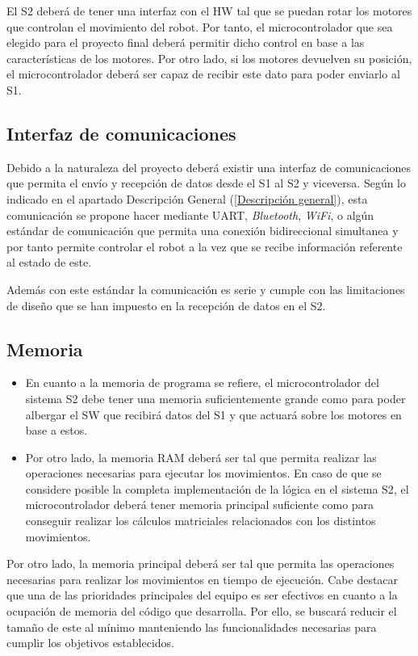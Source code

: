 El \ac{S2} deberá de tener una interfaz con el \ac{HW} tal que se puedan rotar los motores que controlan el movimiento del robot. Por tanto, el microcontrolador que sea elegido para el proyecto final deberá permitir dicho control en base a las características de los motores. Por otro lado, si los motores devuelven su posición, el microcontrolador deberá ser capaz de recibir este dato para poder enviarlo al \ac{S1}.

\subsection{Interfaz de comunicaciones}
Debido a la naturaleza del proyecto deberá existir una interfaz de comunicaciones que permita el envío y recepción de datos desde el \ac{S1} al \ac{S2} y viceversa. Según lo indicado en el apartado Descripción General (\ref{Descripción general}), esta comunicación se propone hacer mediante \ac{UART}, \textit{Bluetooth}, \textit{WiFi}, o algún estándar de comunicación que permita una conexión bidireccional simultanea y por tanto permite controlar el robot a la vez que se recibe información referente al estado de este. 

Además con este estándar la comunicación es serie y cumple con las limitaciones de diseño que se han impuesto en la recepción de datos en el \ac{S2}.

\subsection{Memoria}

\begin{itemize}

    \item En cuanto a la memoria de programa se refiere, el microcontrolador del sistema \ac{S2} debe tener una memoria suficientemente grande como para poder albergar el \ac{SW} que recibirá datos del \ac{S1} y que actuará sobre los motores en base a estos.
    
    \item Por otro lado, la memoria \ac{RAM} deberá ser tal que permita realizar las operaciones necesarias para ejecutar los movimientos. En caso de que se considere posible la completa implementación de la lógica en el sistema \ac{S2}, el microcontrolador deberá tener memoria principal suficiente como para conseguir realizar los cálculos matriciales relacionados con los distintos movimientos.
    
\end{itemize}
Por otro lado, la memoria principal deberá ser tal que permita las operaciones necesarias para realizar los movimientos en tiempo de ejecución. Cabe destacar que una de las prioridades principales del equipo es ser efectivos en cuanto a la ocupación de memoria del código que desarrolla. Por ello, se buscará reducir el tamaño de este al mínimo manteniendo las funcionalidades necesarias para cumplir los objetivos establecidos.   

